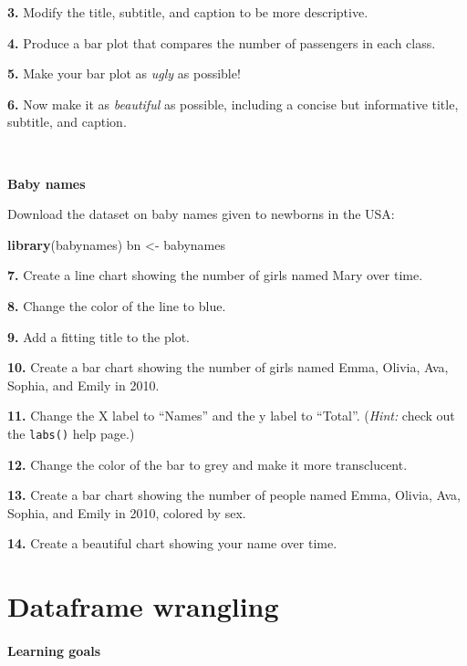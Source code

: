\documentclass[]{book}
\newenvironment{Shaded}{\begin{snugshade}}{\end{snugshade}}
\newcommand{\KeywordTok}[1]{\textcolor[rgb]{0.13,0.29,0.53}{\textbf{#1}}}
\newcommand{\NormalTok}[1]{#1}
\newcommand{\StringTok}[1]{\textcolor[rgb]{0.31,0.60,0.02}{#1}}
\begin{document}
\textbf{3.} Modify the title, subtitle, and caption to be more descriptive.

\textbf{4.} Produce a bar plot that compares the number of passengers in each class.

\textbf{5.} Make your bar plot as \emph{ugly} as possible!

\textbf{6.} Now make it as \emph{beautiful} as possible, including a concise but informative title, subtitle, and caption.

~

\textbf{Baby names}

Download the dataset on baby names given to newborns in the USA:

\begin{Shaded}
\begin{Highlighting}[]
\KeywordTok{library}\NormalTok{(babynames)}
\NormalTok{bn <-}\StringTok{ }\NormalTok{babynames}
\end{Highlighting}
\end{Shaded}

\textbf{7.} Create a line chart showing the number of girls named Mary over time.

\textbf{8.} Change the color of the line to blue.

\textbf{9.} Add a fitting title to the plot.

\textbf{10.} Create a bar chart showing the number of girls named Emma, Olivia, Ava, Sophia, and Emily in 2010.

\textbf{11.} Change the X label to ``Names'' and the y label to ``Total''. (\emph{Hint:} check out the \texttt{labs()} help page.)

\textbf{12.} Change the color of the bar to grey and make it more transclucent.

\textbf{13.} Create a bar chart showing the number of people named Emma, Olivia, Ava, Sophia, and Emily in 2010, colored by sex.

\textbf{14.} Create a beautiful chart showing your name over time.

\hypertarget{dplyr}{%
\chapter{Dataframe wrangling}\label{dplyr}}

\hypertarget{learning-goals-10}{%
\subsubsection*{Learning goals}\label{learning-goals-10}}
\end{document}

